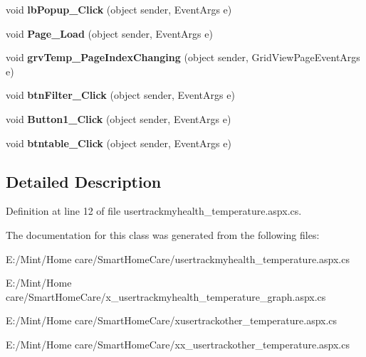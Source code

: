 \begin{DoxyCompactItemize}
\item 
\hypertarget{classusertrackmyhealth__temperature__graph_ac3ec4d636398c97d949afc846af7f84e}{void {\bfseries lb\-Popup\-\_\-\-Click} (object sender, Event\-Args e)}\label{classusertrackmyhealth__temperature__graph_ac3ec4d636398c97d949afc846af7f84e}

\item 
\hypertarget{classusertrackmyhealth__temperature__graph_ada683ebf44d570a6f334fa3a53f9bac2}{void {\bfseries Page\-\_\-\-Load} (object sender, Event\-Args e)}\label{classusertrackmyhealth__temperature__graph_ada683ebf44d570a6f334fa3a53f9bac2}

\item 
\hypertarget{classusertrackmyhealth__temperature__graph_a57232b58e6d4f41390a6e908351ff11f}{void {\bfseries grv\-Temp\-\_\-\-Page\-Index\-Changing} (object sender, Grid\-View\-Page\-Event\-Args e)}\label{classusertrackmyhealth__temperature__graph_a57232b58e6d4f41390a6e908351ff11f}

\item 
\hypertarget{classusertrackmyhealth__temperature__graph_a69cd725e651bfa000e5fd9430121e8b4}{void {\bfseries btn\-Filter\-\_\-\-Click} (object sender, Event\-Args e)}\label{classusertrackmyhealth__temperature__graph_a69cd725e651bfa000e5fd9430121e8b4}

\item 
\hypertarget{classusertrackmyhealth__temperature__graph_a507e535b44bfff55097286b6a20c2a84}{void {\bfseries Button1\-\_\-\-Click} (object sender, Event\-Args e)}\label{classusertrackmyhealth__temperature__graph_a507e535b44bfff55097286b6a20c2a84}

\item 
\hypertarget{classusertrackmyhealth__temperature__graph_a74015065bba07e0ba783042b39aed72b}{void {\bfseries btntable\-\_\-\-Click} (object sender, Event\-Args e)}\label{classusertrackmyhealth__temperature__graph_a74015065bba07e0ba783042b39aed72b}

\end{DoxyCompactItemize}


\subsection{Detailed Description}


Definition at line 12 of file usertrackmyhealth\-\_\-temperature.\-aspx.\-cs.



The documentation for this class was generated from the following files\-:\begin{DoxyCompactItemize}
\item 
E\-:/\-Mint/\-Home care/\-Smart\-Home\-Care/usertrackmyhealth\-\_\-temperature.\-aspx.\-cs\item 
E\-:/\-Mint/\-Home care/\-Smart\-Home\-Care/x\-\_\-usertrackmyhealth\-\_\-temperature\-\_\-graph.\-aspx.\-cs\item 
E\-:/\-Mint/\-Home care/\-Smart\-Home\-Care/xusertrackother\-\_\-temperature.\-aspx.\-cs\item 
E\-:/\-Mint/\-Home care/\-Smart\-Home\-Care/xx\-\_\-usertrackother\-\_\-temperature.\-aspx.\-cs\end{DoxyCompactItemize}
